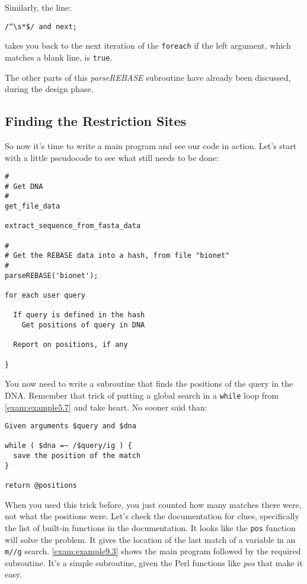 Similarly, the line:

\begin{lstlisting}
/^\s*$/ and next;
\end{lstlisting}

takes you back to the next iteration of the \verb|foreach| if the left argument, which matches a blank line, is \verb|true|.

The other parts of this \textit{parseREBASE} subroutine have already been discussed, during the design phase. 

\subsection{Finding the Restriction Sites}
So now it's time to write a main program and see our code in action. Let's start with a little pseudocode to see what still needs to be done: 

\begin{lstlisting}
#
# Get DNA
#
get_file_data

extract_sequence_from_fasta_data

#
# Get the REBASE data into a hash, from file "bionet"
#
parseREBASE('bionet');

for each user query

  If query is defined in the hash
    Get positions of query in DNA

  Report on positions, if any

}
\end{lstlisting}

You now need to write a subroutine that finds the positions of the query in the DNA. Remember that trick of putting a global search in a \verb|while| loop from \autoref{exam:example5.7} and take heart. No sooner said than: 

\begin{lstlisting}
Given arguments $query and $dna

while ( $dna =~ /$query/ig ) {
  save the position of the match
}

return @positions
\end{lstlisting}

When you used this trick before, you just counted how many matches there were, not what the positions were. Let's check the documentation for clues, specifically the list of built-in functions in the documentation. It looks like the \verb|pos| function will solve the problem. It gives the location of the last match of a variable in an \verb|m//g| search. \autoref{exam:example9.3} shows the main program followed by the required subroutine. It's a simple subroutine, given the Perl functions like \textit{pos} that make it easy. 

